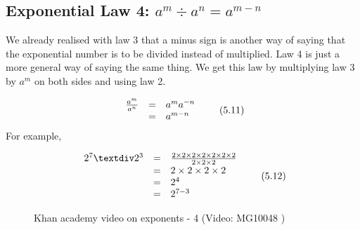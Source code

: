             \subsection{ Exponential Law 4: ${a}^{m}÷{a}^{n}={a}^{m-n}$}
            \nopagebreak
        \label{m38359*id65186}We already realised with law 3 that a minus sign is another way of saying that the exponential number is to be divided instead of multiplied. Law 4 is just a more general way of saying the same thing. We get this law by multiplying law 3 by ${a}^{m}$ on both sides and using law 2.\par 
        \label{m38359*uid24}\nopagebreak\noindent{}
          
    \begin{equation}
    \begin{array}{ccc}\hfill \frac{{a}^{m}}{{a}^{n}}& =& {a}^{m}{a}^{-n}\hfill \\ \hfill & =& {a}^{m-n}\hfill \end{array}\tag{5.11}
      \end{equation}
        \label{m38359*id65293}For example,\par 
        \label{m38359*id65296}\nopagebreak\noindent{}
          
    \begin{equation}
    \begin{array}{ccc}\hfill {2}^{7}÷{2}^{3}& =& \frac{2\ensuremath{\times}2\ensuremath{\times}2\ensuremath{\times}2\ensuremath{\times}2\ensuremath{\times}2\ensuremath{\times}2}{2\ensuremath{\times}2\ensuremath{\times}2}\hfill \\ & =& 2\ensuremath{\times}2\ensuremath{\times}2\ensuremath{\times}2\hfill \\ & =& {2}^{4}\hfill \\ & =& {2}^{7-3}\hfill \end{array}\tag{5.12}
      \end{equation}
\label{m38359*eip-693}
    \setcounter{subfigure}{0}
	\begin{figure}[H] %
    \textnormal{Khan academy video on exponents - 4}\vspace{.1in} \nopagebreak
  \label{m38359*yt-media6}\label{m38359*yt-video6}
             { (Video:  MG10048 )}
      \vspace{2pt}
    \vspace{.1in}
 \end{figure}       \par \label{m38359*secfhsst!!!underscore!!!id1192}
